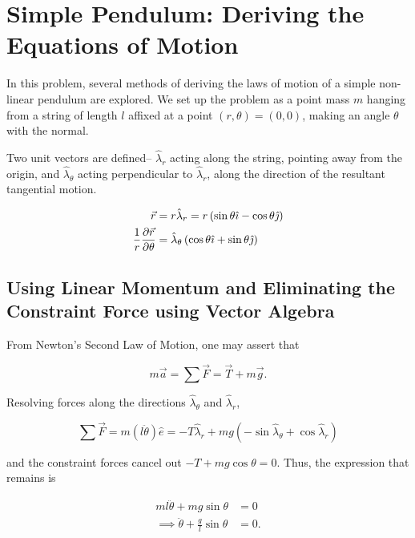 \section{Simple Pendulum: Deriving the Equations of Motion}
In this problem, several methods of deriving the laws of motion of a simple non-linear pendulum are explored. We set up the problem as a point mass $m$ hanging from a string of length $l$ affixed at a point $(r,\theta) = (0,0)$, making an angle $\theta$ with the normal.

Two unit vectors are defined-- $\hat\lambda_r$ acting along the string, pointing away from the origin, and $\hat\lambda_\theta$ acting perpendicular to $\hat\lambda_r$, along the direction of the resultant tangential motion.

\begin{align}
    \vec{r} &= r\hat\lambda_r = r\left(\sin\theta \hat{\imath} - \cos\theta \hat{\jmath}\right) \\
    \frac{1}{r}\frac{\partial \vec{r}}{\partial \theta} &= \hat\lambda_\theta \left(\cos\theta \hat{\imath} + \sin\theta \hat{\jmath}\right)
    \label{eq:problem21:the unit vectors}
\end{align}

\subsection{Using Linear Momentum and Eliminating the Constraint Force using Vector Algebra}
From Newton's Second Law of Motion, one may assert that

\begin{equation}
    m\vec{a} = \sum \vec{F} = \vec{T} + m\vec{g}.
\end{equation}

Resolving forces along the directions $\hat\lambda_\theta$ and $\hat\lambda_r$,

\begin{equation}
    \sum \vec{F} = m(l\ddot\theta) \hat{e}= -T \hat\lambda_r + mg\left(-\sin \hat\lambda_\theta + \cos \hat\lambda_r\right)
    \label{eq:problem21:newton's second law of motion}
\end{equation}

and the constraint forces cancel out $-T + mg\cos\theta = 0$. Thus, the expression that remains is

\begin{align}
    ml\ddot\theta + mg\sin\theta &= 0 \nonumber \\
    \implies \ddot\theta + \frac{g}{l}\sin\theta &= 0.
\end{align}

